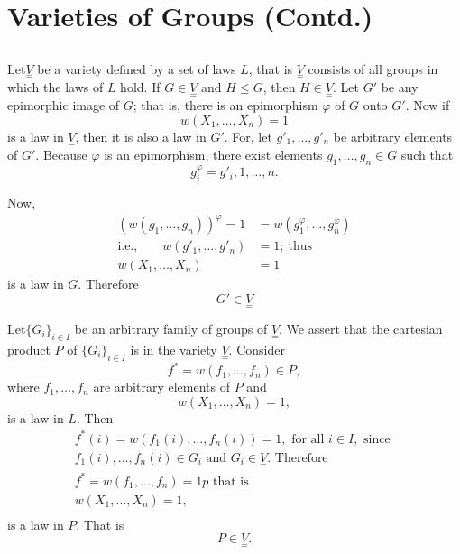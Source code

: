 
\chapter{Varieties of Groups (Contd.)}\label{chap7} %

\section{}\label{chap7:sec1}%

Let\pageoriginale $\underset{=}V$ be a variety defined by a set of laws $L$, that is
$\underset{=}V$ consists of all groups in which the laws of $L$
hold. If $G \in \underset{=}V$ and $H \le G$, then $H
\in \underset{=}V$. Let $G'$ be any epimorphic image of $G$;
that is, there is an epimorphism $\varphi$ of $G$ onto $G'$. Now if  
$$
w(X_1,  \ldots,  X_n) = 1
$$
is a law in $\underset{=}V$, then it is also a law in $G'$. For, let
$g'_1, \ldots,  g'_n$ be arbitrary elements of $G'$. Because $\varphi$ is
an epimorphism, there exist elements $g_1, \ldots,  g_n \in G$
such that  
$$
g^\varphi_i = g'_i,  1, \ldots, n.
$$

Now,
\begin{align*}
  (w(g_1, \ldots, g_n))^\varphi = 1 &= w(g^\varphi_1,  \ldots, 
  g^\varphi_n)\\ 
  \text{i.e.,}\qquad
  w(g'_1, \ldots,  g'_n) & = 1 ; ~\text{thus} \\
  w(X_1, \ldots,  X_n) &= 1
\end{align*}
is a law in $G$.  Therefore
$$
G' \in \underset{=}V
$$

Let\pageoriginale $ \{ G_i  \}_{i \in I}$ be an arbitrary family of groups of
$ \underset{=}{V}$. We assert that the cartesian product $P$ of  $  \{
G_i  \}_{i \in I} $ is in the variety $ \underset{=}{V}
$. Consider 
$$
f^* = w ( f_1, \ldots, f_n ) \in P, 
$$
where $ f_1, \ldots,  f_n $ are arbitrary elements of $P$ and 
$$
w ( X_1, \ldots,  X_n ) = 1,
$$
is a law in $L$. Then
\begin{gather*}
  f^* (i) = w ( f_1 (i), \ldots,  f_n (i)) = 1, \text{ for all } i
  \in I, \text{ since }\\ 
  f_1 (i), \ldots,  f_n (i)  \in  G_i  \text{ and } G_i
  \in \underset{=}{V}. \text{ Therefore }\\ 
  f^* = w ( f_1, \ldots, f_n ) = 1 p \text{ that is } \\
  w ( X_1, \ldots, X_n ) = 1, \\
\end{gather*}
is a law in $P$. That is 
$$
P \in \underset{=}{V}.
$$

